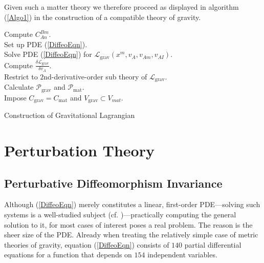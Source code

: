 \documentclass[%
preprint,
titlepage,
nofootinbib,
amsmath,amssymb,
showkeys,
aps,
prd,
floatfix,
]{revtex4-2}
\begin{document}
Given such a matter theory we therefore proceed as displayed in algorithm (\ref{Algo1}) in the construction of a compatible theory of gravity.
\begin{algorithm}[hbt!]
\SetAlgoLined
{}
Compute $C^{Bm}_{An}$. \\
Set up PDE (\ref{DiffeoEqn}). \\
Solve PDE (\ref{DiffeoEqn}) for $\mathcal{L}_{\text{grav}}(x^m,v_A,v_{Am},v_{AI})$.\\
Compute $\frac{\delta \mathcal{L}_{\text{grav}}}{\delta v_A}$.\\
Restrict to $2$nd-derivative-order sub theory of $\mathcal{L}_{\text{grav}}$.\\
Calculate $\mathcal{P}_{\text{grav}}$ and $\mathcal{P}_{\text{mat}}$.\\
Impose $C_{\text{grav}} = C_{\text{mat}}$ and $V_{\text{grav}} \subset V_{mat}.$
 \caption{Construction of Gravitational Lagrangian}\label{Algo1}
\end{algorithm}
\section{Perturbation Theory}\label{chapter2}
\subsection{Perturbative Diffeomorphism Invariance}
Although (\ref{DiffeoEqn}) merely constitutes a linear, first-order PDE---solving such systems is a well-studied subject (cf. \cite{Hilbert})---practically computing the general solution to it, for most cases of interest poses a real problem. The reason is the sheer size of the PDE. Already when treating the relatively simple case of metric theories of gravity, equation (\ref{DiffeoEqn}) consists of $140$ partial differential equations for a function that depends on $154$ independent variables.
\end{document}
